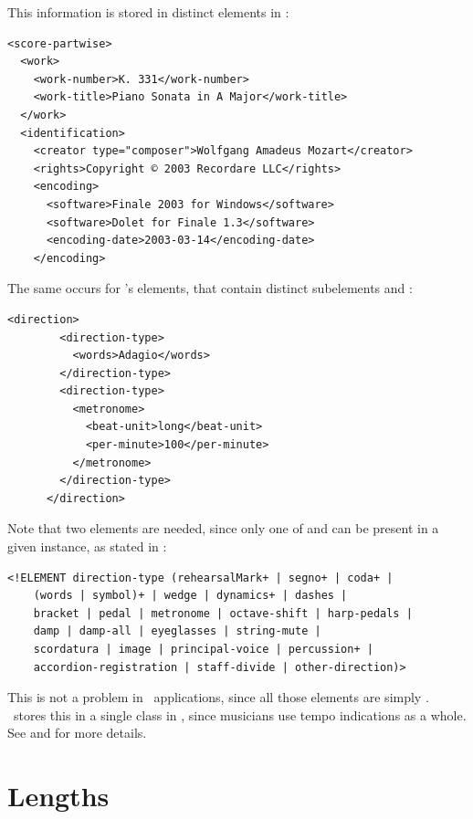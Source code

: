 This information is stored in distinct elements in \mxml:
\begin{lstlisting}[language=MusicXML]
<score-partwise>
  <work>
    <work-number>K. 331</work-number>
    <work-title>Piano Sonata in A Major</work-title>
  </work>
  <identification>
    <creator type="composer">Wolfgang Amadeus Mozart</creator>
    <rights>Copyright © 2003 Recordare LLC</rights>
    <encoding>
      <software>Finale 2003 for Windows</software>
      <software>Dolet for Finale 1.3</software>
      <encoding-date>2003-03-14</encoding-date>
    </encoding>
\end{lstlisting}

The same occurs for \mxml's  elements, that contain distinct subelements  and :
\begin{lstlisting}[language=MusicXML]
      <direction>
        <direction-type>
          <words>Adagio</words>
        </direction-type>
        <direction-type>
          <metronome>
            <beat-unit>long</beat-unit>
            <per-minute>100</per-minute>
          </metronome>
        </direction-type>
      </direction>
\end{lstlisting}

Note that two  elements are needed, since only one of  and  can be present in a given instance, as stated in :
\begin{lstlisting}[language=MusicXML]
<!ELEMENT direction-type (rehearsalMark+ | segno+ | coda+ |
	(words | symbol)+ | wedge | dynamics+ | dashes |
	bracket | pedal | metronome | octave-shift | harp-pedals |
	damp | damp-all | eyeglasses | string-mute |
	scordatura | image | principal-voice | percussion+ |
	accordion-registration | staff-divide | other-direction)>
\end{lstlisting}

This is not a problem in \GUI\ applications, since all those elements are simply \drawn. \msrRepr\ stores this in a single  class in , since musicians use tempo indications as a whole.
See  and  for more details.


\section{Lengths}\label{Lengths}

